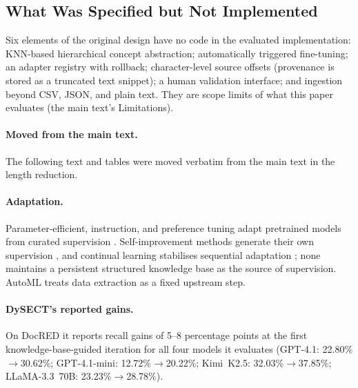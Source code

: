 \documentclass[11pt]{article}
\begin{document}
\subsection{What Was Specified but Not Implemented}
\label{sec:framework-gaps}

Six elements of the original design have no code in the evaluated
implementation: KNN-based hierarchical concept abstraction;
automatically triggered fine-tuning; an adapter registry with rollback;
character-level source offsets (provenance is stored as a truncated text
snippet); a human validation interface; and ingestion beyond CSV, JSON,
and plain text. They are scope limits of what this paper evaluates
(the main text's Limitations).



\paragraph{Moved from the main text.} The following text and tables were moved verbatim from the main text in the length reduction.

\paragraph{Adaptation.} Parameter-efficient, instruction, and preference
tuning adapt pretrained models from curated supervision
\citep{devlin2019bert,houlsby2019peft,lester2021prompttuning,hu2021lora,dettmers2023qlora,wei2022flan,ouyang2022instructgpt,rafailov2023dpo}.
Self-improvement methods generate their own supervision
\citep{madaan2023selfrefine,gulcehre2023rest,chen2024spin,wang2023selfinstruct,schick2023toolformer},
and continual learning stabilises sequential adaptation
\citep{wang2024continuallearning,li2017lwf}; none maintains a persistent
structured knowledge base as the source of supervision. AutoML
\citep{hutter2019automl,he2021automlsurvey,feurer2015autosklearn,feurer2022autosklearn2,erickson2020autogluon,das2020sagemaker,elsken2019nas}
treats data extraction as a fixed upstream step.

\paragraph{DySECT's reported gains.} On DocRED it reports recall gains of 5--8 percentage
points at the first knowledge-base-guided iteration for all four models
it evaluates (GPT-4.1: 22.80\%$\to$30.62\%; GPT-4.1-mini:
12.72\%$\to$20.22\%; Kimi~K2.5: 32.03\%$\to$37.85\%; LLaMA-3.3~70B:
23.23\%$\to$28.78\%).
\end{document}
